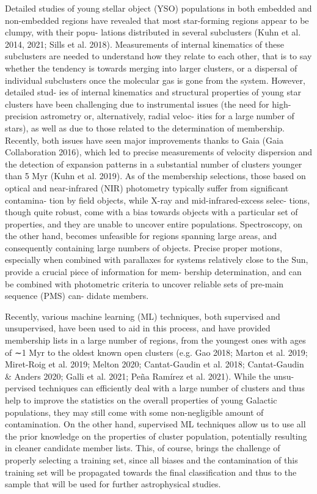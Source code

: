 \documentclass[../main.tex]{subfiles}
\begin{document}
{Detailed studies of young stellar object (YSO) populations
in both embedded and non-embedded regions have revealed that
most star-forming regions appear to be clumpy, with their popu-
lations distributed in several subclusters (Kuhn et al. 2014, 2021;
Sills et al. 2018). Measurements of internal kinematics of these
subclusters are needed to understand how they relate to each
other, that is to say whether the tendency is towards merging into
larger clusters, or a dispersal of individual subclusters once the
molecular gas is gone from the system. However, detailed stud-
ies of internal kinematics and structural properties of young star
clusters have been challenging due to instrumental issues (the
need for high-precision astrometry or, alternatively, radial veloc-
ities for a large number of stars), as well as due to those related
to the determination of membership. Recently, both issues have
seen major improvements thanks to Gaia (Gaia Collaboration
2016), which led to precise measurements of velocity dispersion
and the detection of expansion patterns in a substantial number
of clusters younger than 5 Myr (Kuhn et al. 2019). As of the
membership selections, those based on optical and near-infrared
(NIR) photometry typically suﬀer from significant contamina-
tion by field objects, while X-ray and mid-infrared-excess selec-
tions, though quite robust, come with a bias towards objects with
a particular set of properties, and they are unable to uncover
entire populations. Spectroscopy, on the other hand, becomes
unfeasible for regions spanning large areas, and consequently
containing large numbers of objects. Precise proper motions,
especially when combined with parallaxes for systems relatively
close to the Sun, provide a crucial piece of information for mem-
bership determination, and can be combined with photometric
criteria to uncover reliable sets of pre-main sequence (PMS) can-
didate members.

Recently, various machine learning (ML) techniques,
both supervised and unsupervised, have been used to aid in
this process, and have provided membership lists in a large
number of regions, from the youngest ones with ages of
∼1 Myr to the oldest known open clusters (e.g. Gao 2018;
Marton et al. 2019; Miret-Roig et al. 2019; Melton 2020;
Cantat-Gaudin et al. 2018; Cantat-Gaudin & Anders 2020;
Galli et al. 2021; Peña Ramírez et al. 2021). While the unsu-
pervised techniques can eﬃciently deal with a large number of
clusters and thus help to improve the statistics on the overall
properties of young Galactic populations, they may still come
with some non-negligible amount of contamination. On the
other hand, supervised ML techniques allow us to use all
the prior knowledge on the properties of cluster population,
potentially resulting in cleaner candidate member lists. This,
of course, brings the challenge of properly selecting a training
set, since all biases and the contamination of this training
set will be propagated towards the final classification and thus to the sample that will be used for further astrophysical
studies.

}
\end{document}
